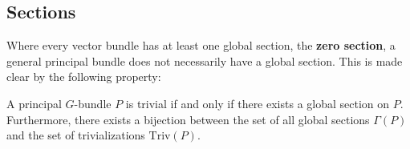 \subsection{Sections}
	Where every vector bundle has at least one global section, the \textbf{zero section}\footnotemark, a general principal bundle does not necessarily have a global section. This is made clear by the following property:
	\begin{property}
		A principal $G$-bundle $P$ is trivial if and only if there exists a global section on $P$. Furthermore, there exists a bijection between the set of all global sections $\Gamma(P)$ and the set of trivializations $\text{Triv}(P)$.
	\end{property}




